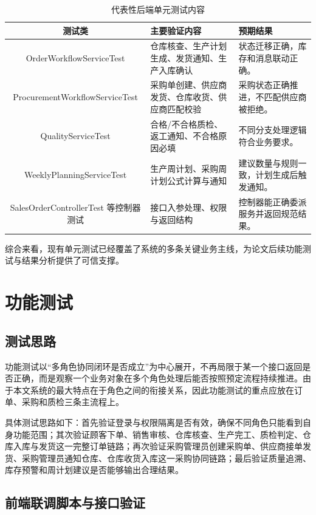 \begin{table}[htbp]
\centering
\footnotesize
\caption{代表性后端单元测试内容}
\label{tab:unit-test-real}
\begin{tabular}{|c|p{4.2cm}|p{5.8cm}|}
\hline
测试类 & 主要验证内容 & 预期结果 \\\hline
OrderWorkflowServiceTest & 仓库核查、生产计划生成、发货通知、生产入库确认 & 状态迁移正确，库存和消息联动正确。 \\\hline
ProcurementWorkflowServiceTest & 采购单创建、供应商发货、仓库收货、供应商匹配校验 & 采购状态正确推进，不匹配供应商被拒绝。 \\\hline
QualityServiceTest & 合格/不合格质检、返工通知、不合格原因必填 & 不同分支处理逻辑符合业务要求。 \\\hline
WeeklyPlanningServiceTest & 生产周计划、采购周计划公式计算与通知 & 建议数量与规则一致，计划生成后触发通知。 \\\hline
SalesOrderControllerTest 等控制器测试 & 接口入参处理、权限与返回结构 & 控制器能正确委派服务并返回规范结果。 \\\hline
\end{tabular}
\end{table}

综合来看，现有单元测试已经覆盖了系统的多条关键业务主线，为论文后续功能测试与结果分析提供了可信支撑。

\section{功能测试}

\subsection{测试思路}

功能测试以“多角色协同闭环是否成立”为中心展开，不再局限于某一个接口返回是否正确，而是观察一个业务对象在多个角色处理后能否按照预定流程持续推进。由于本文系统的最大特点在于角色之间的衔接关系，因此功能测试的重点应放在订单、采购和质检三条主流程上。

具体测试思路如下：首先验证登录与权限隔离是否有效，确保不同角色只能看到自身功能范围；其次验证顾客下单、销售审核、仓库核查、生产完工、质检判定、仓库入库与发货这一完整订单链路；再次验证采购管理员创建采购单、供应商接单发货、采购管理员通知仓库、仓库收货入库这一采购协同链路；最后验证质量追溯、库存预警和周计划建议是否能够输出合理结果。

\subsection{前端联调脚本与接口验证}


